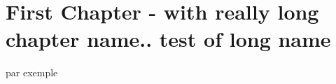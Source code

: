 \chapter{First Chapter - with really long chapter name.. test of long name}
\begin{paragraph}[color=red,size=\tiny][V][oico]
par exemple
\blindtext
\bfseries{\blindtext}
\end{paragraph}
\begin{paragraph}
\blindtext
\end{paragraph}
